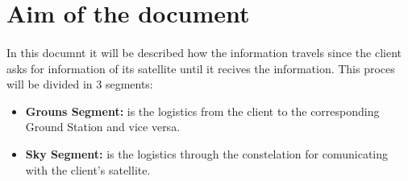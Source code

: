 \section{Aim of the document}
\paragraph{}
In this documnt it will be described how the information travels since the client  asks for information of its satellite until it recives the information. This proces will be divided in 3 segments:

\begin{itemize}

\item \textbf{Grouns Segment:} is the logistics from the client to the corresponding Ground Station and vice versa.

\item \textbf{Sky Segment:} is the logistics through the constelation for comunicating with the client's satellite.

\end{itemize}